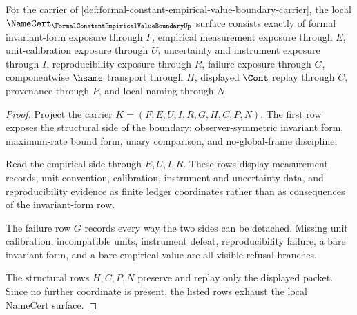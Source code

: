 \begin{theorem}
\label{thm:formal-constant-empirical-value-boundary-namecert-obligations}
For the carrier of \autoref{def:formal-constant-empirical-value-boundary-carrier}, the local $\NameCert_{\FormalConstantEmpiricalValueBoundaryUp}$ surface consists exactly of formal invariant-form exposure through $F$, empirical measurement exposure through $E$, unit-calibration exposure through $U$, uncertainty and instrument exposure through $I$, reproducibility exposure through $R$, failure exposure through $G$, componentwise $\hsame$ transport through $H$, displayed $\Cont$ replay through $C$, provenance through $P$, and local naming through $N$.
\end{theorem}
\begin{proof}
Project the carrier $K=(F,E,U,I,R,G,H,C,P,N)$. The first row exposes the structural side of the boundary: observer-symmetric invariant form, maximum-rate bound form, unary comparison, and no-global-frame discipline.

Read the empirical side through $E,U,I,R$. These rows display measurement records, unit convention, calibration, instrument and uncertainty data, and reproducibility evidence as finite ledger coordinates rather than as consequences of the invariant-form row.

The failure row $G$ records every way the two sides can be detached. Missing unit calibration, incompatible units, instrument defeat, reproducibility failure, a bare invariant form, and a bare empirical value are all visible refusal branches.

The structural rows $H,C,P,N$ preserve and replay only the displayed packet. Since no further coordinate is present, the listed rows exhaust the local NameCert surface.
\end{proof}

